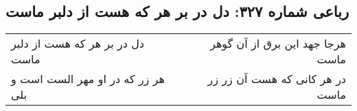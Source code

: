\begin{center}
\section*{رباعی شماره ۳۲۷: دل در بر هر که هست از دلبر ماست}
\label{sec:0327}
\begin{longtable}{l p{0.5cm} r}
دل در بر هر که هست از دلبر ماست
&&
هرجا جهد این برق از آن گوهر ماست
\\
هر زر که در او مهر الست است و بلی
&&
در هر کانی که هست آن زر زر ماست
\\
\end{longtable}
\end{center}
